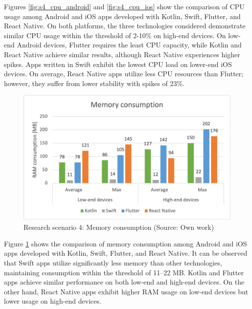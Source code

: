 Figures \ref{fig:s4_cpu_android} and \ref{fig:s4_cpu_ios} show the comparison of CPU usage among Android and iOS apps developed with Kotlin, Swift, Flutter, and React Native. On both platforms, the three technologies considered demonstrate similar CPU usage within the threshold of 2-10\% on high-end devices. On low-end Android devices, Flutter requires the least CPU capacity, while Kotlin and React Native achieve similar results, although React Native experiences higher spikes. Apps written in Swift exhibit the lowest CPU load on lower-end iOS devices. On average, React Native apps utilize less CPU resources than Flutter; however, they suffer from lower stability with spikes of 23\%.

\begin{figure}[H]
    \centering
    \includegraphics[width=.6\textwidth]{img/scenario4_ram}
    \caption{Research scenario 4: Memory consumption (Source: Own work)}
    \label{fig:s4_ram}
\end{figure}

Figure \ref{fig:s4_ram} shows the comparison of memory consumption among Android and iOS apps developed with Kotlin, Swift, Flutter, and React Native. It can be observed that Swift apps utilize significantly less memory than other technologies, maintaining consumption within the threshold of 11--22 MB. Kotlin and Flutter apps achieve similar performance on both low-end and high-end devices. On the other hand, React Native apps exhibit higher RAM usage on low-end devices but lower usage on high-end devices.
